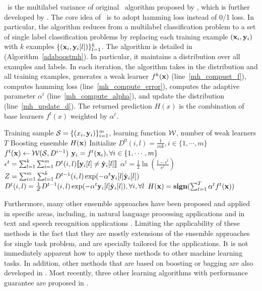 {\adaboostmh\ is the multilabel variance of original \adaboost\ algorithm proposed by \citet{Schapire99improved}, which is further developed by \citet{Esuli2008boosting}.
The core idea of \adaboostmh\ is to adopt hamming loss instead of 0/1 loss. 
In particular, the algorithm reduces from a multilabel classification problem to a set of single label classification problems by replacing each training example $(\mathbf {x}_i,\mathbf {y}_i)$ with $k$ examples $\{(\mathbf {x}_i,\mathbf {y}_i[l])\}_{l=1}^k$.
The algorithm is detailed in (Algorithm~\ref{adaboostmh}).
In particular, it maintains a distribution over all examples and labels.
In each iteration, the algorithm takes in the distribution and all training examples, generates a weak learner $f^k(\mathbf {x})$ (line~\ref{mh_compuet_f}), computes hamming loss (line~\ref{mh_compute_error}), computes the adaptive parameter $\alpha^t$ (line~\ref{mh_compute_alpha}), and update the distribution (line~\ref{mh_update_d}).
The returned prediction $H(x)$ is the combination of base learners $f^t(x)$ weighted by $\alpha^t$.
\begin{algorithm}
\caption{\adaboostmh}
\label{adaboostmh}
\begin{algorithmic}[1]
	\REQUIRE Training sample $\mathcal{S} = \{(x_i,\mathbf {y}_i)\}_{i=1}^m$, learning function $\mathcal{W}$, number of weak learners $T$
	\ENSURE Boosting ensemble $H(\mathbf {x})$
	\STATE Initialize $D^0(i,l)=\frac{1}{mk},i\in\{1,\cdots,m\}$
		\STATE $f^t(\mathbf {x})\leftarrow\mathcal{W}(\mathcal{S},D^{i-1})$ \label{mh_compuet_f}
		\STATE $\mathbf {y}_i = f^t(\mathbf {x}_i),\forall i\in\{1,\cdots,m\}$
		\STATE $\epsilon^t =\sum_{l=1}^k\sum_{i=1}^{m}D^t(i,l){\llbracket \mathbf {y}_i[l]\neq\hat{\mathbf {y}}_i[l] \rrbracket}$ \label{mh_compute_error}
		\STATE $\alpha^{t} = \frac{1}{2}\ln\left(\frac{1-\epsilon^t}{\epsilon^t}\right)$ \label{mh_compute_alpha}
		\STATE $Z=\sum_{i=1}^{m}\sum_{l=1}^{k}D^{t-1}(i,l)\exp(-\alpha^t\mathbf {y}_i[l]\hat{\mathbf {y}}_i[l])$
		\STATE $D^t(i,l) = \frac{1}{Z}D^{t-1}(i,l)\exp(-\alpha^t\mathbf {y}_i[l]\hat{\mathbf {y}}_i[l]),\forall i,\forall l$ \label{mh_update_d}
	\ENDFOR
	\RETURN $H(\mathbf {x}) = \textbf{sign}(\sum_{t=1}^T\alpha^tf^t(\mathbf {x}))$
\end{algorithmic}
\end{algorithm}

Furthermore, many other ensemble approaches have been proposed and applied in specific areas, including, in natural language processing applications \citep{Collins05distrimnative,Zeman05improving,Sagae06parsing,Zhang09kbest} and 
in text and speech recognition applications \citep{Fiscus97a,Benesty08speech,Petrov10products}.
Limiting the applicability of these methods is the fact that they are mostly extensions of the ensemble approaches for single task problem, and are specially tailored for the applications.
It is not immediately apparent how to apply these methods to other machine learning tasks.
In addition, other methods that are based on boosting or bagging are also developed in \citep{Wang07simple,Kocev13tree}.
Most recently, three other learning algorithms with performance guarantee are proposed in \citep{Cortes14semble}.

}

